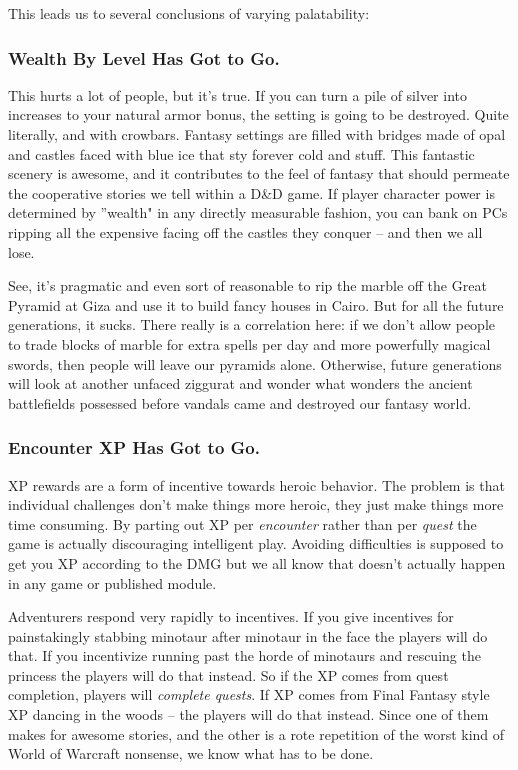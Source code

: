This leads us to several conclusions of varying palatability:

\subsubsection{Wealth By Level Has Got to Go.}

This hurts a lot of people, but it's true. If you can turn a pile of silver into increases to your natural armor bonus, the setting is going to be destroyed. Quite literally, and with crowbars. Fantasy settings are filled with bridges made of opal and castles faced with blue ice that sty forever cold and stuff. This fantastic scenery is awesome, and it contributes to the feel of fantasy that should permeate the cooperative stories we tell within a D\&D game. If player character power is determined by ''wealth" in any directly measurable fashion, you can bank on PCs ripping all the expensive facing off the castles they conquer -- and then we all lose.

See, it's pragmatic and even sort of reasonable to rip the marble off the Great Pyramid at Giza and use it to build fancy houses in Cairo. But for all the future generations, it sucks. There really is a correlation here: if we don't allow people to trade blocks of marble for extra spells per day and more powerfully magical swords, then people will leave our pyramids alone. Otherwise, future generations will look at another unfaced ziggurat and wonder what wonders the ancient battlefields possessed before vandals came and destroyed our fantasy world.

\subsubsection{Encounter XP Has Got to Go.}

XP rewards are a form of incentive towards heroic behavior. The problem is that individual challenges don't make things more heroic, they just make things more time consuming. By parting out XP per \textit{encounter} rather than per \textit{quest} the game is actually discouraging intelligent play. Avoiding difficulties is supposed to get you XP according to the DMG but we all know that doesn't actually happen in any game or published module.

Adventurers respond very rapidly to incentives. If you give incentives for painstakingly stabbing minotaur after minotaur in the face the players will do that. If you incentivize running past the horde of minotaurs and rescuing the princess the players will do that instead. So if the XP comes from quest completion, players will \textit{complete quests}. If XP comes from Final Fantasy style XP dancing in the woods -- the players will do that instead. Since one of them makes for awesome stories, and the other is a rote repetition of the worst kind of World of Warcraft nonsense, we know what has to be done.

